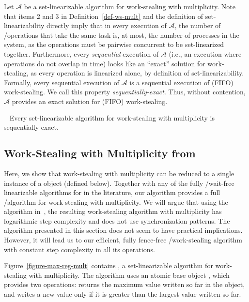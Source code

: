 Let \(\mathcal A\) be a set-linearizable algorithm for work-stealing with multiplicity.  Note that items 2 and 3 in Definition~\ref{def-ws-mult} and the definition of set-linearizability directly imply that in every execution of \(\mathcal A\), the number of \Take/\Steal operations that take the same task is, at most, the number of processes in the system, as the operations must be pairwise concurrent to be set-linearized together. Furthermore, every \emph{sequential} execution of \(\mathcal A\) (i.e., an execution where operations do not overlap in time) looks like an ``exact'' solution for work-stealing, as every operation is linearized alone, by definition of set-linearizability. Formally, every sequential execution of \(\mathcal A\) is a sequential execution of (FIFO) work-stealing. We call this property \emph{sequentially-exact}.  Thus, without contention, \(\mathcal A\) provides an exact solution for (FIFO) work-stealing.


\begin{remark}~\label{remark-seq-exact-set-lin}
Every set-linearizable algorithm for work-stealing with multiplicity is sequentially-exact.
\end{remark}

\subsection{\label{sec-ws-mult-max-reg}Work-Stealing with Multiplicity from \MaxReg}


Here, we show that work-stealing with multiplicity can be reduced to a single instance of a \MaxReg object (defined below).  Together with any of the fully \R/\W wait-free linearizable algorithms for \MaxReg in the literature, our algorithm provides a full \R/\W algorithm for work-stealing with multiplicity.  We will argue that using the \MaxReg algorithm in~\cite{DBLP_journals_jacm_AspnesAC12}, the resulting work-stealing algorithm with multiplicity has logarithmic step complexity and does not use \RAW synchronization patterns. The algorithm presented in this section does not seem to have practical implications. However, it will lead us to our efficient, fully fence-free \R/\W work-stealing algorithm with constant step complexity in all its operations.

Figure~\ref{figure-max-reg-mult} contains \WFWSM, a set-linearizable algorithm for work-stealing with multiplicity. The algorithm uses an atomic base object \MaxReg, which provides two operations: \MaxR returns the maximum value written so far in the object, and \MaxW writes a new value only if it is greater than the largest value written so far.


